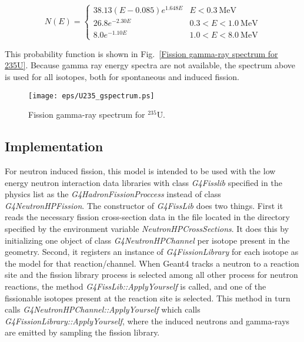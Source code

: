 \documentclass[11pt]{article}
\newcommand{\notgeant}[1]{}%
\begin{document}
\begin{equation}
N(E) = \left\{
\begin{array}{ll}
38.13 (E-0.085)e^{1.648E}&  E<0.3\ \mathrm{MeV} \\

26.8 e^{-2.30E}          &  0.3<E<1.0\ \mathrm{MeV}\\

 8.0 e^{-1.10E}          &  1.0<E<8.0\ \mathrm{MeV}
\end{array}
\right.
\end{equation}

This probability function is shown in Fig.~\ref{Fission gamma-ray
spectrum for 235U}.  Because gamma ray energy spectra are not
available, the spectrum above is used for all isotopes, both for
spontaneous and induced fission.

\begin{figure}[ht]
\begin{center}
\texttt{[image: eps/U235\_gspectrum.ps]}
\end{center}
\caption{Fission gamma-ray spectrum for $^{235}$U.}
\label{Fission gamma-ray spectrum for 235U}
\end{figure}




\subsection{Implementation}

For neutron induced fission, this model is intended to be used with
the low energy neutron interaction data libraries with class
\textit{G4Fisslib} specified in the physics list as the
\textit{G4HadronFissionProccess} instead of class
\textit{G4NeutronHPFission}.\notgeant{
Here is an example code snippet for registering this model in the physics 
list: }
The constructor of \textit{G4FissLib}
does two things. First it reads the necessary fission cross-section
data in the file located in the directory specified by the environment
variable \textit{NeutronHPCrossSections}. It does this by initializing
one object of class \textit{G4NeutronHPChannel} per isotope present in
the geometry. Second, it registers an instance of
\textit{G4FissionLibrary} for each isotope as the model for that
reaction/channel. When Geant4 tracks a neutron to a reaction site and
the fission library process is selected among all other process for
neutron reactions, the method \textit{G4FissLib::ApplyYourself} is
called, and one of the fissionable isotopes present at the reaction
site is selected. This method in turn calls
\textit{G4NeutronHPChannel::ApplyYourself} which calls
\textit{G4FissionLibrary::ApplyYourself}, where the induced neutrons
and gamma-rays are emitted by sampling the fission library.
\end{document}
